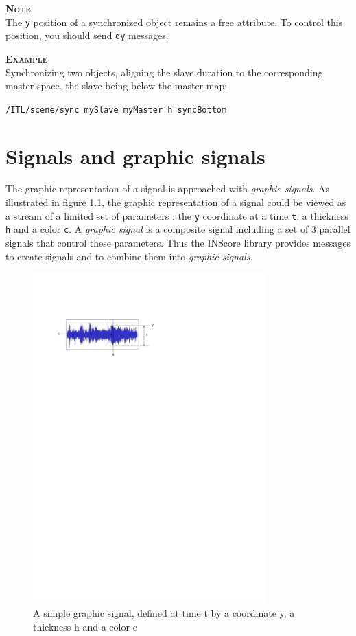 \documentclass[a4paper,twoside]{report}
\newcommand{\toplevel}[1]	{\chapter{#1}}
\newcommand{\OSC}[1]		{\texttt{#1}}
\newcommand{\values}[1]	{\texttt{#1}}
\newcommand{\example}		{\textbf{\hspace{-1.5cm}\textbf{\textsc{Example }}}}
\newcommand{\note}	[1]		{\vspace{2mm}\textbf{\hspace{-1.03cm}\textbf{\textsc{Note #1}}}}
\newcommand{\sample}	[1]			{\vspace{-2mm}\begin{center}\colorbox{mygrey}{
								\begin{minipage}[t]{0.9\columnwidth} 
								{\small \texttt{#1}}
								\end{minipage}}\end{center}}
\begin{document}
\note{} \\
The \values{y} position of a synchronized object remains a free attribute. To control this position, you should send \OSC{dy} messages.  

\example \\
Synchronizing two objects, aligning the slave duration to the corresponding master space, the slave being below the master map:
\sample{/ITL/scene/sync mySlave myMaster h syncBottom}


\toplevel{Signals and graphic signals}
\label{graphsig}

The graphic representation of a signal is approached with \emph{graphic signals}. As illustrated in figure \ref{graphimg}, the graphic representation of a signal could be viewed as a stream of a limited set of parameters : the \values{y} coordinate at a time \values{t}, a thickness \values{h} and a color \values{c}. 
A \emph{graphic signal} is a composite signal including a set of 3 parallel signals that control these parameters. Thus the INScore library provides messages to create signals and to combine them into \emph{graphic signals}. 

\begin{figure}[h]
	\centering \includegraphics[width=90mm]{imgs/graph}
 \caption{A simple graphic signal, defined at time t by a coordinate y, a thickness h and a color c}
 \label{graphimg}
\end{figure}
\end{document}
